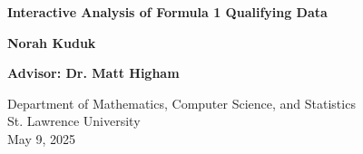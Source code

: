 \begin{titlepage}
   \begin{center}
       \vspace*{1cm}
       \LARGE
       \textbf{Interactive Analysis of Formula 1 Qualifying Data}

       \vspace{1.5cm}
       \Large
       \textbf{Norah Kuduk}

       \vspace{0.5cm}
       \textbf{Advisor: Dr. Matt Higham}

       \vspace{0.8cm}

       Department of Mathematics, Computer Science, and Statistics\\
       St. Lawrence University\\
       May 9, 2025

   \end{center}
\end{titlepage}

\clearpage
